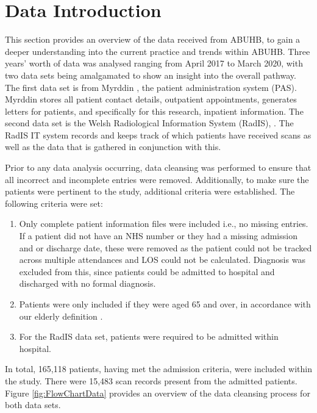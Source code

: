 \documentclass[../thesis.tex]{subfiles}
\begin{document}
\section{Data Introduction} \label{sec:dataintroduction}
This section provides an overview of the data received from ABUHB, to gain a deeper understanding into the current practice and trends within ABUHB. Three years' worth of data was analysed ranging from April 2017 to March 2020, with two data sets being amalgamated to show an insight into the overall pathway. The first data set is from Myrddin \cite{WAO2018}, the patient administration system (PAS). Myrddin stores all patient contact details, outpatient appointments, generates letters for patients, and specifically for this research, inpatient information. The second data set is the Welsh Radiological Information System (RadIS), \cite{WAO2018}. The RadIS IT system records and keeps track of which patients have received scans as well as the data that is gathered in conjunction with this.

Prior to any data analysis occurring, data cleansing was performed to ensure that all incorrect and incomplete entries were removed. Additionally, to make sure the patients were pertinent to the study, additional criteria were established. The following criteria were set:
\begin{enumerate}
    \item Only complete patient information files were included i.e., no missing entries. If a patient did not have an NHS number or they had a missing admission and or discharge date, these were removed as the patient could not be tracked across multiple attendances and LOS could not be calculated. Diagnosis was excluded from this, since patients could be admitted to hospital and discharged with no formal diagnosis.
    \item Patients were only included if they were aged 65 and over, in accordance with our elderly definition \cite{OECD}.
    \item For the RadIS data set, patients were required to be admitted within hospital.
\end{enumerate}

In total, 165,118 patients, having met the admission criteria, were included within the study. There were 15,483 scan records present from the admitted patients. Figure \ref{fig:FlowChartData} provides an overview of the data cleansing process for both data sets.
\end{document}
